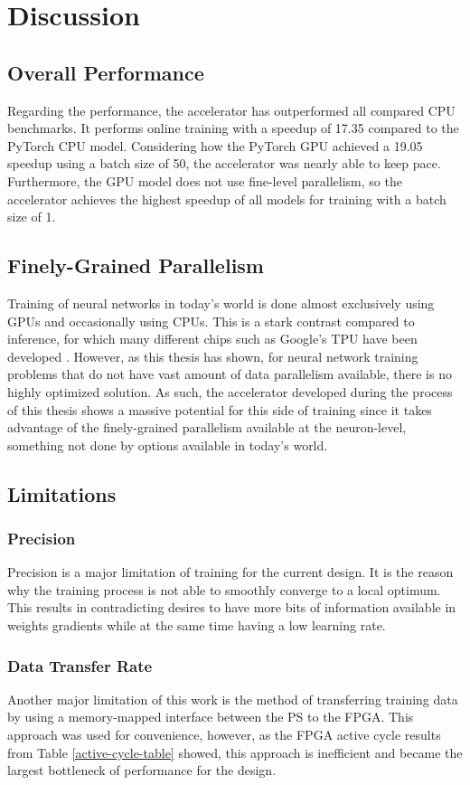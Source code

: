 \chapter{Discussion}\label{discussion}
\section{Overall Performance}
Regarding the performance, the accelerator has outperformed all compared CPU benchmarks. It performs online training with a speedup of 17.35 compared to the PyTorch CPU model. Considering how the PyTorch GPU achieved a 19.05 speedup using a batch size of 50, the accelerator was nearly able to keep pace. Furthermore, the GPU model does not use fine-level parallelism, so the accelerator achieves the highest speedup of all models for training with a batch size of 1.

\section{Finely-Grained Parallelism}
Training of neural networks in today's world is done almost exclusively using GPUs and occasionally using CPUs. This is a stark contrast compared to inference, for which many different chips such as Google's TPU have been developed \cite{TPU}. However, as this thesis has shown, for neural network training problems that do not have vast amount of data parallelism available, there is no highly optimized solution. As such, the accelerator developed during the process of this thesis shows a massive potential for this side of training since it takes advantage of the finely-grained parallelism available at the neuron-level, something not done by options available in today's world.

\section{Limitations}
\subsection{Precision}
Precision is a major limitation of training for the current design. It is the reason why the training process is not able to smoothly converge to a local optimum. This results in contradicting desires to have more bits of information available in weights gradients while at the same time having a low learning rate.

\subsection{Data Transfer Rate}
Another major limitation of this work is the method of transferring training data by using a memory-mapped interface between the PS to the FPGA. This approach was used for convenience, however, as the FPGA active cycle results from Table \ref{active-cycle-table} showed, this approach is inefficient and became the largest bottleneck of performance for the design.


